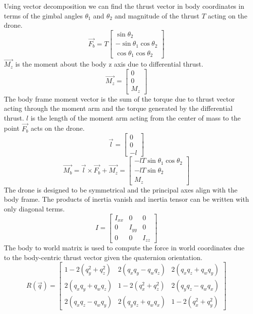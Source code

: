 \documentclass[]{article}
\begin{document}
	Using vector decomposition we can find the thrust vector in body coordinates in terms of the gimbal angles $\theta_1$ and $\theta_2$ and magnitude of the thrust $T$ acting on the drone.
\[
\vec{F_b} = T
\begin{bmatrix}
	\sin{\theta_2}  \\
	-\sin{\theta_1}\cos{\theta_2}  \\
	\cos{\theta_1}\cos{\theta_2}
\end{bmatrix}
\]
$\vec{M_z}$ is the moment about the body z axis due to differential thrust. 
        \[
	\vec{M_z} =
        \begin{bmatrix}
        0  \\
        0  \\
        M_z
        \end{bmatrix}
        \]
The body frame moment vector is the sum of the torque due to thrust vector acting through the moment arm and the torque generated by the differential thrust. $l$ is the length of the moment arm acting from the center of mass to the point $\vec{F_b}$ acts on the drone. 
        \[
	\vec{l} =
        \begin{bmatrix}
        0  \\
        0  \\
        -l
        \end{bmatrix}
        \]
        	 \[
        \vec{M_b} = \vec{l} \times \vec{F_b} + \vec{M_z}=       
        \begin{bmatrix}
        -lT\sin{\theta_1}\cos{\theta_2}  \\
        -lT\sin{\theta_2}  \\
	M_z
        \end{bmatrix}
        \]
The drone is designed to be symmetrical and the principal axes align with the body frame. The products of inertia vanish and inertia tensor can be written with only diagonal terms.
         \[
        I =
        \begin{bmatrix}
        I_{xx} & 0 &0 \\
        0 & I_{yy }& 0 \\
        0 & 0 & I_{zz}
        \end{bmatrix}
        \]
The body to world matrix is used to compute the force in world coordinates due to the body-centric thrust vector given the quaternion orientation.
        \[
        R(\vec{q}) =
        \begin{bmatrix}
        1 - 2(q_y^2 + q_z^2) & 2(q_x q_y - q_w q_z) & 2(q_x q_z + q_w q_y) \\
        2(q_x q_y + q_w q_z) & 1 - 2(q_x^2 + q_z^2) & 2(q_y q_z - q_w q_x) \\
        2(q_x q_z - q_w q_y) & 2(q_y q_z + q_w q_x) & 1 - 2(q_x^2 + q_y^2)
        \end{bmatrix}
        \]
\end{document}
